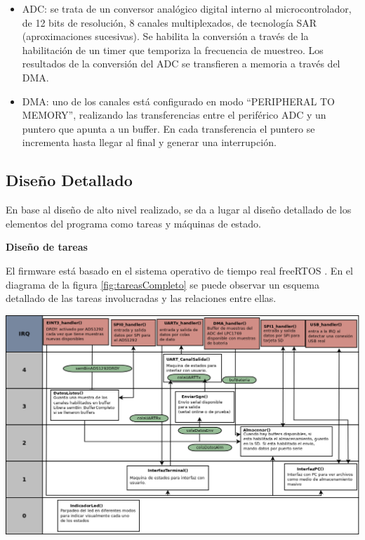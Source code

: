 \begin{itemize}
	\item ADC: se trata de un conversor analógico digital interno al microcontrolador, de 12 bits de resolución, 8 canales multiplexados, de tecnología SAR (aproximaciones sucesivas). Se habilita la conversión a través de la habilitación de un timer que temporiza la frecuencia de muestreo. Los resultados de la conversión del ADC se transfieren a memoria a través del DMA.
	\item DMA: uno de los canales está configurado en modo “PERIPHERAL TO MEMORY”, realizando las transferencias entre el periférico ADC y un puntero que apunta a un buffer. En cada transferencia el puntero se incrementa hasta llegar al final y generar una interrupción. 
\end{itemize}

\subsection{Diseño Detallado} \label{disDetallado}

En base al diseño de alto nivel realizado, se da a lugar al diseño detallado de los elementos del programa como tareas y máquinas de estado.

\clearpage
\textbf{Diseño de tareas}

El firmware está basado en el sistema operativo de tiempo real freeRTOS \citep{aws2017}.  En el diagrama de la figura \ref{fig:tareasCompleto} se puede observar un esquema detallado de las tareas involucradas y las relaciones entre ellas. 

\begin{adjustbox}{center,caption={Diagrama de tareas completo},label={fig:tareasCompleto},nofloat=figure,vspace=\bigskipamount}
\includegraphics[scale = 0.35, angle=90]{./Figures/VOP24_tareas_v1.png}
\label{tareasCompleto}
\end{adjustbox}


